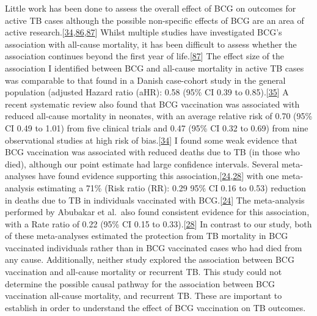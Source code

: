 \documentclass[11pt,twoside]{bristolthesis}
\begin{document}
  Little work has been done to assess the overall effect of BCG on outcomes for active TB cases although the possible non-specific effects of BCG are an area of active research.{[}\protect\hyperlink{ref-Higgins}{34},\protect\hyperlink{ref-Kandasamy2016}{86},\protect\hyperlink{ref-Pollard2017}{87}{]} Whilst multiple studies have investigated BCG's association with all-cause mortality, it has been difficult to assess whether the association continues beyond the first year of life.{[}\protect\hyperlink{ref-Pollard2017}{87}{]} The effect size of the association I identified between BCG and all-cause mortality in active TB cases was comparable to that found in a Danish case-cohort study in the general population (adjusted Hazard ratio (aHR): 0.58 (95\% CI 0.39 to 0.85).{[}\protect\hyperlink{ref-Rieckmann2016}{35}{]} A recent systematic review also found that BCG vaccination was associated with reduced all-cause mortality in neonates, with an average relative risk of 0.70 (95\% CI 0.49 to 1.01) from five clinical trials and 0.47 (95\% CI 0.32 to 0.69) from nine observational studies at high risk of bias.{[}\protect\hyperlink{ref-Higgins}{34}{]} I found some weak evidence that BCG vaccination was associated with reduced deaths due to TB (in those who died), although our point estimate had large confidence intervals. Several meta-analyses have found evidence supporting this association,{[}\protect\hyperlink{ref-Colditz1994}{24},\protect\hyperlink{ref-Abubakar2013}{28}{]} with one meta-analysis estimating a 71\% (Risk ratio (RR): 0.29 95\% CI 0.16 to 0.53) reduction in deaths due to TB in individuals vaccinated with BCG.{[}\protect\hyperlink{ref-Colditz1994}{24}{]} The meta-analysis performed by Abubakar et al.~also found consistent evidence for this association, with a Rate ratio of 0.22 (95\% CI 0.15 to 0.33).{[}\protect\hyperlink{ref-Abubakar2013}{28}{]} In contrast to our study, both of these meta-analyses estimated the protection from TB mortality in BCG vaccinated individuals rather than in BCG vaccinated cases who had died from any cause. Additionally, neither study explored the association between BCG vaccination and all-cause mortality or recurrent TB. This study could not determine the possible causal pathway for the association between BCG vaccination all-cause mortality, and recurrent TB. These are important to establish in order to understand the effect of BCG vaccination on TB outcomes.
  
\end{document}
